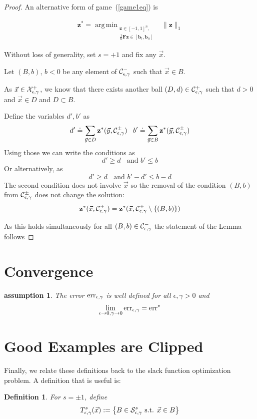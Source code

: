 \documentclass{article}
\newtheorem{assumption}[theorem]{assumption}
\newtheorem{defn}[thm]{Definition}
\DeclareMathOperator*{\argmin}{arg\,min}
\newcommand{\err}{\mbox{err}}
\newcommand{\x}{\vec{x}}
\newcommand{\y}{\vec{y}}
\newcommand{\lrsetb}[1]{\left\{#1\right\}}
\newcommand{\vF}{\mathbf{F}}
\newcommand{\vb}{\mathbf{b}}
\newcommand{\vz}{\mathbf{z}}
\begin{document}
\begin{proof}
  An alternative form of game~(\ref{game1eq}) is

\begin{align}
\displaystyle  \label{game2eq}
\vz^* = \argmin_{\substack{ \vz \in [-1,1]^n ,
    \\ \frac{1}{n} \vF \vz \in [\vb_l,\vb_u]}} \;\; \|\vz\|_1
\end{align}

Without loss of generality, set $s=+1$ and fix any $\x$.

Let $(B,b)$, $b<0$ be any element of ${\cal C}_{\epsilon,\gamma}^{-}$
such that $\x \in B$.

As $\x \in \XepsGam^{+}$, we know that there exists another ball
$(D,d) \in {\cal C}_{\epsilon,\gamma}^{+}$ such that $d>0$ and $\x \in D$ and $D \subset B$.

Define the variables $d',b'$ as
\[
d' \doteq \sum_{\y \in D} \vz^*(\y,\ConstrepsGam^{\pm})   \;\;\; b' \doteq \sum_{\y \in B} \vz^*(\y,\ConstrepsGam^{\pm})
\]
Using those we can write the conditions as
\[
d'\geq d \;\; \mbox{ and } b' \leq b
\]
Or alternatively, as
\[
d' \geq d \;\; \mbox{ and } b'-d' \leq b-d
\]
The second condition does not involve $\x$ so the removal of the condition $(B,b)$ from ${\cal C}_{\epsilon,\gamma}^{\pm}$ does not change the solution:
\[
\vz^*(\x,\ConstrepsGam^{\pm}) = \vz^*(\x,\ConstrepsGam^{\pm} \setminus \{(B,b)\} ) 
\]

As this holds simultaneously for all $(B,b) \in {\cal C}_{\epsilon,\gamma}^{-}$ the statement of the Lemma follows
\end{proof}
  
\section{Convergence}


\begin{assumption} The error $\erreg$ is well defined for all
  $\epsilon,\gamma>0$ and
  \[
  \lim_{\epsilon \to 0, \gamma \to 0} \erreg = \err^*
  \]
\end{assumption}






\section{Good Examples are Clipped}

Finally, we relate these definitions back to the slack function optimization problem. 
A definition that is useful is:
\begin{defn}
For $s = \pm 1$, define 
\begin{align*}
T_{\epsilon, \gamma}^{s} (\x) := \lrsetb{ B \in \SepsGam^{s} \mbox{ s.t. } \x \in B}
\end{align*}
\end{defn}
\end{document}
